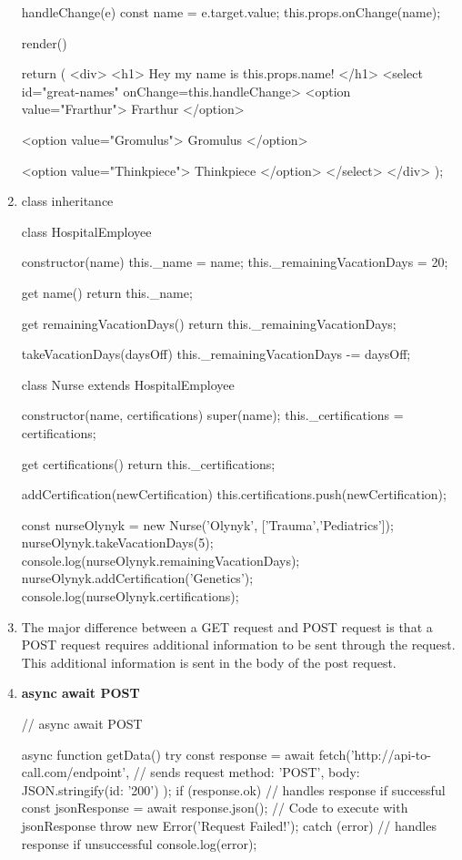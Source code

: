 \documentclass[a4paper,12pt]{article}
\begin{document}
\begin{enumerate}
\begin{jscode}
{  handleChange(e) {
    const name = e.target.value;
    this.props.onChange(name);
  }
  
  render() {
    return (
      <div>
        <h1>
          Hey my name is {this.props.name}!
        </h1>
        <select id="great-names" onChange={this.handleChange}>
          <option value="Frarthur">
            Frarthur
          </option>

          <option value="Gromulus">
            Gromulus
          </option>

          <option value="Thinkpiece">
            Thinkpiece
          </option>
        </select>
      </div>
    );
  }
}
\end{jscode}


\item class inheritance
\begin{jscode}
class HospitalEmployee {
  constructor(name) {
    this._name = name;
    this._remainingVacationDays = 20;
  }
  
  get name() {
    return this._name;
  }
  
  get remainingVacationDays() {
    return this._remainingVacationDays;
  }
  
  takeVacationDays(daysOff) {
    this._remainingVacationDays -= daysOff;
  }
}

class Nurse extends HospitalEmployee {
  constructor(name, certifications) {
    super(name);
    this._certifications = certifications;
  }  
  
  get certifications() {
    return this._certifications;
  }
  
  addCertification(newCertification) {
    this.certifications.push(newCertification);
  }
}

const nurseOlynyk = new Nurse('Olynyk', ['Trauma','Pediatrics']);
nurseOlynyk.takeVacationDays(5);
console.log(nurseOlynyk.remainingVacationDays);
nurseOlynyk.addCertification('Genetics');
console.log(nurseOlynyk.certifications);
\end{jscode}

\item The major difference between a GET request and POST request is that a POST request requires additional information to be sent through the request. This additional information is sent in the body of the post request.

\item \textbf{async await POST}
\begin{jscode}
// async await POST

async function getData(){
  try {
    const response = await fetch('http://api-to-call.com/endpoint', { // sends request
      method: 'POST',
      body: JSON.stringify({id: '200'})
    });
    if (response.ok){ // handles response if successful
      const jsonResponse = await response.json();
      // Code to execute with jsonResponse
    }
    throw new Error('Request Failed!');
  } catch (error){ // handles response if unsuccessful
    console.log(error);
  }
}
\end{jscode}


\end{enumerate}
\end{document}
